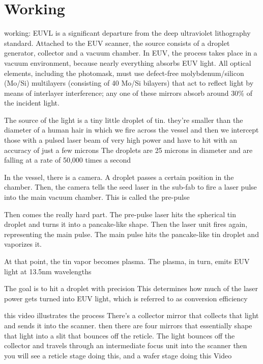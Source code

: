 \documentclass[12pt,a4paper]{report}
\begin{document}

\section{Working}

working: 
EUVL is a significant departure from the deep 
ultraviolet lithography standard. 
Attached to the EUV scanner, the source consists 
of a droplet generator, collector and a vacuum chamber. 
In EUV, the process takes place in a vacuum 
environment, because nearly everything absorbs 
EUV light.
{All optical elements, including the photomask,
 must use defect-free molybdenum/silicon (Mo/Si) 
 multilayers (consisting of 40 Mo/Si bilayers) that 
act to reflect light by means of interlayer 
interference; any one of these mirrors absorb
 around 30\% 
of the incident light.
}

The source of the light is a tiny little droplet of tin.
 they're smaller than 
the diameter of a human hair in which we fire 
across the vessel and then we intercept those 
with a pulsed laser 
beam of very high power and have to hit with 
an accuracy of just a few microns
The droplets are 25 microns in diameter and 
are falling at a rate of 50,000 times a second


In the vessel, there is a camera. A droplet 
passes a certain position in the chamber. 
Then, the camera tells the seed laser in the 
sub-fab to fire a laser pulse into the main 
vacuum chamber. This is called the pre-pulse

Then comes the really hard part. The pre-pulse 
laser hits the spherical tin droplet and turns 
it into a pancake-like shape. Then the laser 
unit fires again, representing the main pulse. 
The main pulse hits the pancake-like tin droplet
 and vaporizes it.


At that point, the tin vapor becomes plasma. 
The plasma, in turn, emits EUV light at 13.5nm 
wavelengths

The goal is to hit a droplet with precision
This determines how much of the laser power 
gets turned into EUV light, 
which is referred to as conversion efficiency

this {video illustrates the process}
There's a collector mirror that collects that light
and sends it into the scanner. then there are 
four mirrors that essentially shape that light 
into a slit that
bounces off the reticle.
The light bounces off the collector and travels 
through an intermediate focus unit into the scanner
then you will see a reticle stage doing this, 
and a wafer stage doing this {Video}
\end{document}
